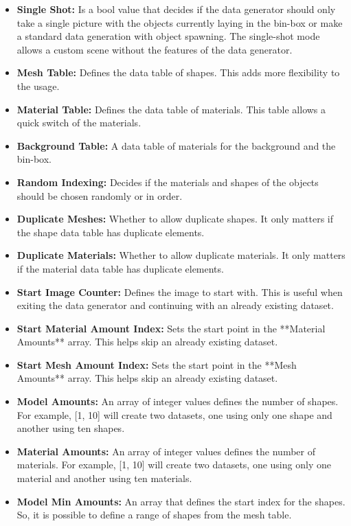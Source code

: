 		\begin{itemize}
			\item \textbf{Single Shot:} Is a bool value that decides if the data generator should only take a single picture with the objects currently laying in the bin-box or make a standard data generation with object spawning. The single-shot mode allows a custom scene without the features of the data generator.
			\item \textbf{Mesh Table:} Defines the data table of shapes. This adds more flexibility to the usage.
			\item \textbf{Material Table:} Defines the data table of materials. This table allows a quick switch of the materials.
			\item \textbf{Background Table:} A data table of materials for the background and the bin-box.
			\item \textbf{Random Indexing:} Decides if the materials and shapes of the objects should be chosen randomly or in order.
			\item \textbf{Duplicate Meshes:} Whether to allow duplicate shapes. It only matters if the shape data table has duplicate elements.
			\item \textbf{Duplicate Materials:} Whether to allow duplicate materials. It only matters if the material data table has duplicate elements.
			\item  \textbf{Start Image Counter:} Defines the image to start with. This is useful when exiting the data generator and continuing with an already existing dataset.
			\item \textbf{Start Material Amount Index:} Sets the start point in the **Material Amounts** array. This helps skip an already existing dataset.
			\item \textbf{Start Mesh Amount Index:} Sets the start point in the **Mesh Amounts** array. This helps skip an already existing dataset.
			\item \textbf{Model Amounts:} An array of integer values defines the number of shapes. For example, [1, 10] will create two datasets, one using only one shape and another using ten shapes.
			\item \textbf{Material Amounts:} An array of integer values defines the number of materials. For example, [1, 10] will create two datasets, one using only one material and another using ten materials.
			\item \textbf{Model Min Amounts:} An array that defines the start index for the shapes. So, it is possible to define a range of shapes from the mesh table.

\end{itemize}
